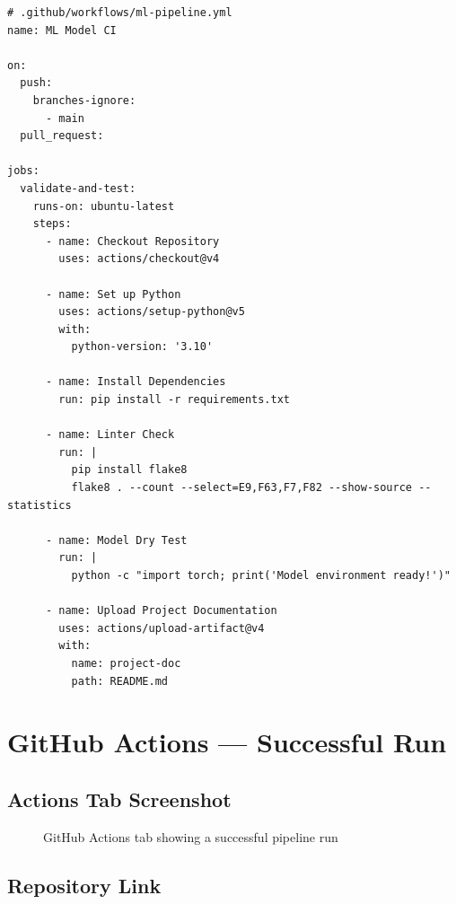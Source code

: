 \documentclass[11pt,a4paper]{article}
\begin{document}
\begin{lstlisting}[style=yamlstyle, caption={Corrected ml-pipeline.yml}]
# .github/workflows/ml-pipeline.yml
name: ML Model CI

on:
  push:
    branches-ignore:
      - main
  pull_request:

jobs:
  validate-and-test:
    runs-on: ubuntu-latest
    steps:
      - name: Checkout Repository
        uses: actions/checkout@v4

      - name: Set up Python
        uses: actions/setup-python@v5
        with:
          python-version: '3.10'

      - name: Install Dependencies
        run: pip install -r requirements.txt

      - name: Linter Check
        run: |
          pip install flake8
          flake8 . --count --select=E9,F63,F7,F82 --show-source --statistics

      - name: Model Dry Test
        run: |
          python -c "import torch; print('Model environment ready!')"

      - name: Upload Project Documentation
        uses: actions/upload-artifact@v4
        with:
          name: project-doc
          path: README.md
\end{lstlisting}

\section{GitHub Actions --- Successful Run}

\subsection{Actions Tab Screenshot}

\begin{figure}[H]
\centering
{}
\caption{GitHub Actions tab showing a successful pipeline run}
\label{fig:actions_green}
\end{figure}

\subsection{Repository Link}
\end{document}
